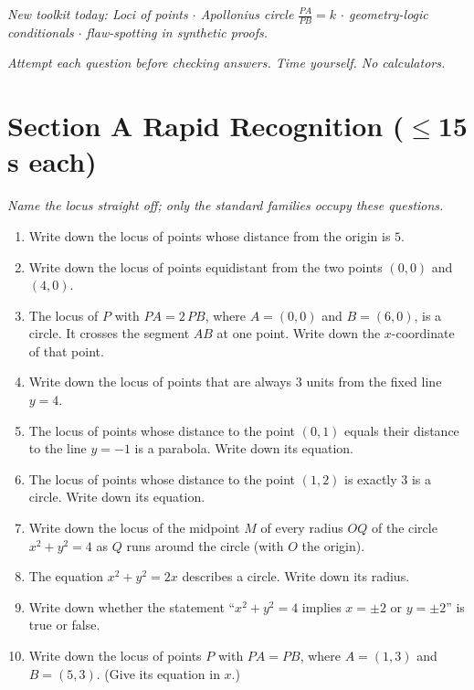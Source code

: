 \documentclass[11pt,a4paper]{article}
\begin{document}
\noindent\textit{New toolkit today: Loci of points $\cdot$ Apollonius circle $\frac{PA}{PB}=k$ $\cdot$ geometry-logic conditionals $\cdot$ flaw-spotting in synthetic proofs.}

\vspace{2pt}
\noindent\textit{Attempt each question before checking answers. Time yourself. No calculators.}

\section*{Section A \quad Rapid Recognition \hfill{\normalfont\small($\leq$15 s each)}}

\noindent\textit{Name the locus straight off; only the standard families occupy these questions.}

\begin{enumerate}

\item Write down the locus of points whose distance from the origin is $5$.

\item Write down the locus of points equidistant from the two points $(0,0)$ and $(4,0)$.

\item The locus of $P$ with $PA=2\,PB$, where $A=(0,0)$ and $B=(6,0)$, is a circle. It crosses the segment $AB$ at one point. Write down the $x$-coordinate of that point.

\item Write down the locus of points that are always $3$ units from the fixed line $y=4$.

\item The locus of points whose distance to the point $(0,1)$ equals their distance to the line $y=-1$ is a parabola. Write down its equation.

\item The locus of points whose distance to the point $(1,2)$ is exactly $3$ is a circle. Write down its equation.

\item Write down the locus of the midpoint $M$ of every radius $OQ$ of the circle $x^2+y^2=4$ as $Q$ runs around the circle (with $O$ the origin).

\item The equation $x^2+y^2=2x$ describes a circle. Write down its radius.

\item Write down whether the statement ``$x^2+y^2=4$ implies $x=\pm 2$ or $y=\pm 2$'' is true or false.

\item Write down the locus of points $P$ with $PA=PB$, where $A=(1,3)$ and $B=(5,3)$. (Give its equation in $x$.)

\end{enumerate}
\end{document}
